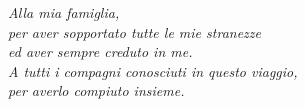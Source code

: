 
\pagestyle{empty}
\vspace*{140pt}
\begin{flushright}
\emph{
Alla mia famiglia,\\
per aver sopportato tutte le mie stranezze\\
ed aver sempre creduto in me.\\
A tutti i compagni conosciuti in questo viaggio,\\
per averlo compiuto insieme.
}
\end{flushright}
\clearpage